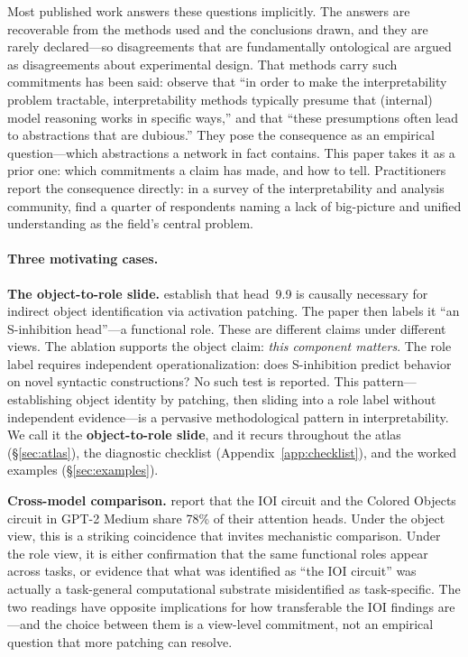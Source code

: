 \documentclass{article}
\begin{document}
Most published work answers these questions implicitly.  The answers are
recoverable from the methods used and the conclusions drawn, and they are
rarely declared---so disagreements that are fundamentally ontological are
argued as disagreements about experimental design.  That methods carry
such commitments has been said: \citet{anwar2024} observe that ``in order
to make the interpretability problem tractable, interpretability methods
typically presume that (internal) model reasoning works in specific ways,''
and that ``these presumptions often lead to abstractions that are
dubious.''  They pose the consequence as an empirical question---which
abstractions a network in fact contains.  This paper takes it as a prior
one: which commitments a claim has made, and how to tell.  Practitioners report the
consequence directly: in a survey of the interpretability and analysis
community, \citet{mosbach2024} find a quarter of respondents naming a lack of
big-picture and unified understanding as the field's central problem.

\paragraph{Three motivating cases.}

\textbf{The object-to-role slide.}
\citet{wang2022} establish that head~9.9 is causally necessary for
indirect object identification via activation patching.  The paper then
labels it ``an S-inhibition head''---a functional role.  These are
different claims under different views.  The ablation supports the
object claim: \emph{this component matters}.  The role label requires
independent operationalization: does S-inhibition predict behavior on
novel syntactic constructions?  No such test is reported.  This
pattern---establishing object identity by patching, then sliding into a
role label without independent evidence---is a pervasive methodological
pattern in interpretability.
We call it the \textbf{object-to-role slide}, and it recurs throughout
the atlas (\S\ref{sec:atlas}), the diagnostic checklist
(Appendix~\ref{app:checklist}), and the worked examples
(\S\ref{sec:examples}).

\textbf{Cross-model comparison.}
\citet{merullo2024} report that the IOI circuit and the Colored Objects
circuit in GPT-2 Medium share 78\% of their attention heads.  Under the
object view, this is a striking coincidence that invites mechanistic
comparison.  Under the role view, it is either confirmation that the
same functional roles appear across tasks, or evidence that what was
identified as ``the IOI circuit'' was actually a task-general
computational substrate misidentified as task-specific.  The two
readings have opposite implications for how transferable the IOI
findings are---and the choice between them is a view-level commitment,
not an empirical question that more patching can resolve.
\end{document}
